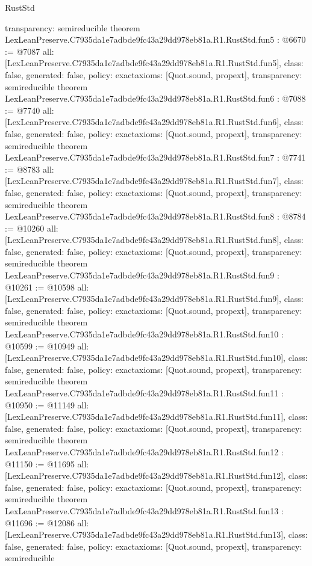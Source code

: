\begin{lexlean}{RustStd}
\begin{coremodule}
{  transparency: semireducible
}
theorem LexLeanPreserve.C7935da1e7adbde9fc43a29dd978eb81a.R1.RustStd.fun5 : @6670 := @7087 {
  all: [LexLeanPreserve.C7935da1e7adbde9fc43a29dd978eb81a.R1.RustStd.fun5],
  class: false,
  generated: false,
  policy: exact{axioms: [Quot.sound, propext]},
  transparency: semireducible
}
theorem LexLeanPreserve.C7935da1e7adbde9fc43a29dd978eb81a.R1.RustStd.fun6 : @7088 := @7740 {
  all: [LexLeanPreserve.C7935da1e7adbde9fc43a29dd978eb81a.R1.RustStd.fun6],
  class: false,
  generated: false,
  policy: exact{axioms: [Quot.sound, propext]},
  transparency: semireducible
}
theorem LexLeanPreserve.C7935da1e7adbde9fc43a29dd978eb81a.R1.RustStd.fun7 : @7741 := @8783 {
  all: [LexLeanPreserve.C7935da1e7adbde9fc43a29dd978eb81a.R1.RustStd.fun7],
  class: false,
  generated: false,
  policy: exact{axioms: [Quot.sound, propext]},
  transparency: semireducible
}
theorem LexLeanPreserve.C7935da1e7adbde9fc43a29dd978eb81a.R1.RustStd.fun8 : @8784 := @10260 {
  all: [LexLeanPreserve.C7935da1e7adbde9fc43a29dd978eb81a.R1.RustStd.fun8],
  class: false,
  generated: false,
  policy: exact{axioms: [Quot.sound, propext]},
  transparency: semireducible
}
theorem LexLeanPreserve.C7935da1e7adbde9fc43a29dd978eb81a.R1.RustStd.fun9 : @10261 := @10598 {
  all: [LexLeanPreserve.C7935da1e7adbde9fc43a29dd978eb81a.R1.RustStd.fun9],
  class: false,
  generated: false,
  policy: exact{axioms: [Quot.sound, propext]},
  transparency: semireducible
}
theorem LexLeanPreserve.C7935da1e7adbde9fc43a29dd978eb81a.R1.RustStd.fun10 : @10599 := @10949 {
  all: [LexLeanPreserve.C7935da1e7adbde9fc43a29dd978eb81a.R1.RustStd.fun10],
  class: false,
  generated: false,
  policy: exact{axioms: [Quot.sound, propext]},
  transparency: semireducible
}
theorem LexLeanPreserve.C7935da1e7adbde9fc43a29dd978eb81a.R1.RustStd.fun11 : @10950 := @11149 {
  all: [LexLeanPreserve.C7935da1e7adbde9fc43a29dd978eb81a.R1.RustStd.fun11],
  class: false,
  generated: false,
  policy: exact{axioms: [Quot.sound, propext]},
  transparency: semireducible
}
theorem LexLeanPreserve.C7935da1e7adbde9fc43a29dd978eb81a.R1.RustStd.fun12 : @11150 := @11695 {
  all: [LexLeanPreserve.C7935da1e7adbde9fc43a29dd978eb81a.R1.RustStd.fun12],
  class: false,
  generated: false,
  policy: exact{axioms: [Quot.sound, propext]},
  transparency: semireducible
}
theorem LexLeanPreserve.C7935da1e7adbde9fc43a29dd978eb81a.R1.RustStd.fun13 : @11696 := @12086 {
  all: [LexLeanPreserve.C7935da1e7adbde9fc43a29dd978eb81a.R1.RustStd.fun13],
  class: false,
  generated: false,
  policy: exact{axioms: [Quot.sound, propext]},
  transparency: semireducible
}
\end{coremodule}
\end{lexlean}
